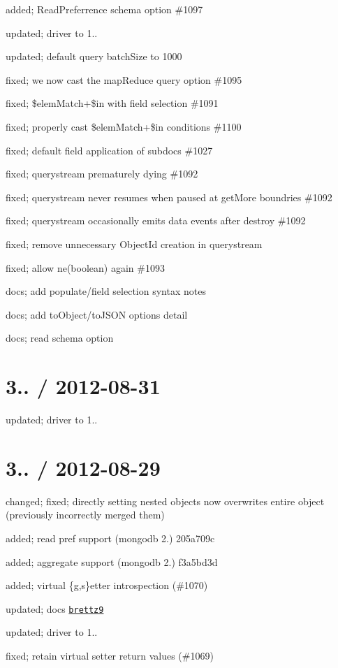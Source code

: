 \begin{DoxyItemize}
\item added; Read\+Preferrence schema option \#1097
\item updated; driver to 1..
\item updated; default query batch\+Size to 1000
\item fixed; we now cast the map\+Reduce query option \#1095
\item fixed; \$elem\+Match+\$in with field selection \#1091
\item fixed; properly cast \$elem\+Match+\$in conditions \#1100
\item fixed; default field application of subdocs \#1027
\item fixed; querystream prematurely dying \#1092
\item fixed; querystream never resumes when paused at get\+More boundries \#1092
\item fixed; querystream occasionally emits data events after destroy \#1092
\item fixed; remove unnecessary Object\+Id creation in querystream
\item fixed; allow ne(boolean) again \#1093
\item docs; add populate/field selection syntax notes
\item docs; add to\+Object/to\+J\+S\+ON options detail
\item docs; {\ttfamily read} schema option
\end{DoxyItemize}

\section*{3.. / 2012-\/08-\/31 }


\begin{DoxyItemize}
\item updated; driver to 1..
\end{DoxyItemize}

\section*{3.. / 2012-\/08-\/29 }


\begin{DoxyItemize}
\item changed; fixed; directly setting nested objects now overwrites entire object (previously incorrectly merged them)
\item added; read pref support (mongodb 2.) 205a709c
\item added; aggregate support (mongodb 2.) f3a5bd3d
\item added; virtual \{g,s\}etter introspection (\#1070)
\item updated; docs \href{https://github.com/brettz9}{\tt brettz9}
\item updated; driver to 1..
\item fixed; retain virtual setter return values (\#1069)
\end{DoxyItemize}

